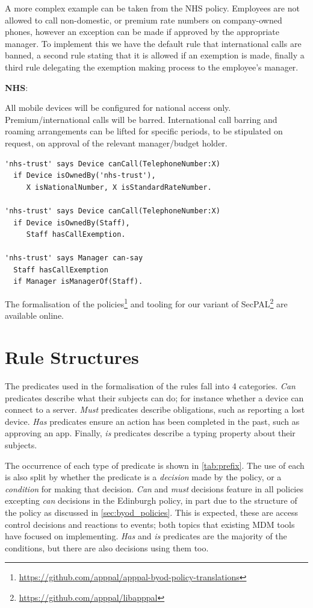 \documentclass[conference,twocolumn]{IEEEtran}
\newenvironment{policyrule}[1]{%
  \begin{mdframed}\footnotesize
    \noindent\textbf{\sffamily #1}:~\itshape%
  }{%
  \end{mdframed}
}
\begin{document}
A more complex example can be taken from the NHS policy.
Employees are not allowed to call non-domestic, or premium rate numbers on company-owned phones, however an exception can be made if approved by the appropriate manager.
To implement this we have the default rule that international calls are banned, a second rule stating that it is allowed if an exemption is made, finally a third rule delegating the exemption making process to the employee's manager.
\begin{policyrule}{NHS}
  All mobile devices will be configured for national access only. Premium/international calls will be barred. 
  International call barring and roaming arrangements can be lifted for specific periods, to be stipulated on request, on approval of the relevant manager/budget holder.
  \begin{lstlisting}
'nhs-trust' says Device canCall(TelephoneNumber:X) 
  if Device isOwnedBy('nhs-trust'),
     X isNationalNumber, X isStandardRateNumber.

'nhs-trust' says Device canCall(TelephoneNumber:X)
  if Device isOwnedBy(Staff),
     Staff hasCallExemption.

'nhs-trust' says Manager can-say
  Staff hasCallExemption
  if Manager isManagerOf(Staff).
  \end{lstlisting}
\end{policyrule}

The formalisation of the policies\footnote{\url{https://github.com/apppal/apppal-byod-policy-translations}} and tooling for our variant of SecPAL\footnote{\url{https://github.com/apppal/libapppal}} are available online.

\section{Rule Structures}

The predicates used in the formalisation of the rules fall into 4 categories.
\emph{Can} predicates describe what their subjects can do; for instance whether a device can connect to a server.
\emph{Must} predicates describe obligations, such as reporting a lost device.
\emph{Has} predicates ensure an action has been completed in the past, such as approving an app.
Finally, \emph{is} predicates describe a typing property about their subjects.

The occurrence of each type of predicate is shown in \autoref{tab:prefix}.
The use of each is also split by whether the predicate is a \emph{decision} made by the policy, or a \emph{condition} for making that decision.
\emph{Can} and \emph{must} decisions feature in all policies excepting \emph{can} decisions in the Edinburgh policy, in part due to the structure of the policy as discussed in \autoref{sec:byod_policies}.
This is expected, these are access control decisions and reactions to events; both topics that existing MDM tools have focused on implementing.
\emph{Has} and \emph{is} predicates are the majority of the conditions, but there are also decisions using them too.
\end{document}
